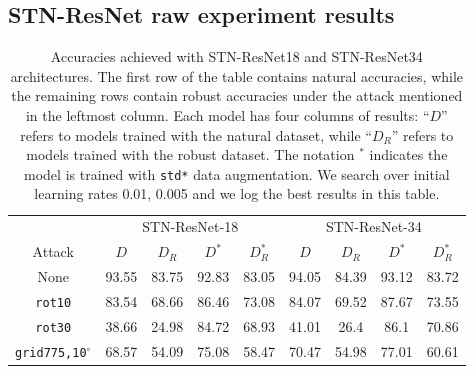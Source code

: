 \subsection{STN-ResNet raw experiment results}
\begin{table}[htb]
    \caption{Accuracies achieved with STN-ResNet18 and STN-ResNet34 architectures. The first row of the table contains natural accuracies, while the remaining rows contain robust accuracies under the attack mentioned in the leftmost column. Each model has four columns of results: ``$D$'' refers to models trained with the natural dataset, while ``$D_R$'' refers to models trained with the robust dataset. The notation $^*$ indicates the model is trained with \texttt{std*} data augmentation. We search over initial learning rates {0.01, 0.005} and we log the best results in this table.} \label{tab:stnresults}
    \begin{adjustwidth}{-.5in}{-.5in}  
        \vspace{15pt}
        \begin{center}
            \begin{tabular}{|c|cccc|cccc|}
                \hline
                & 
                \multicolumn{4}{c|}{STN-ResNet-18} & \multicolumn{4}{c|}{STN-ResNet-34} \\
                Attack & $D$ & $D_R$ & $D^*$ & $D_R^*$ & $D$ & $D_R$ & $D^*$ & $D_R^*$ \\ 
                \hline
                None &
                93.55 & 83.75 & 92.83 & 83.05 &  %
                94.05 & 84.39 & 93.12 & 83.72   %
                \\
                \texttt{rot10} &
                83.54 & 68.66 & 86.46 & 73.08 &  %
                84.07 & 69.52 & 87.67 & 73.55   %
                \\
                \texttt{rot30} &
                38.66 & 24.98 & 84.72 & 68.93 &  %
                41.01 & 26.4 & 86.1 & 70.86   %
                \\
                \texttt{grid775,10$^\circ$} &
                68.57 & 54.09 &75.08 &  %
                58.47 & 70.47 & 54.98 & 77.01 & 60.61   %
                \\

\end{tabular}
\end{center}
\end{adjustwidth}
\end{table}
